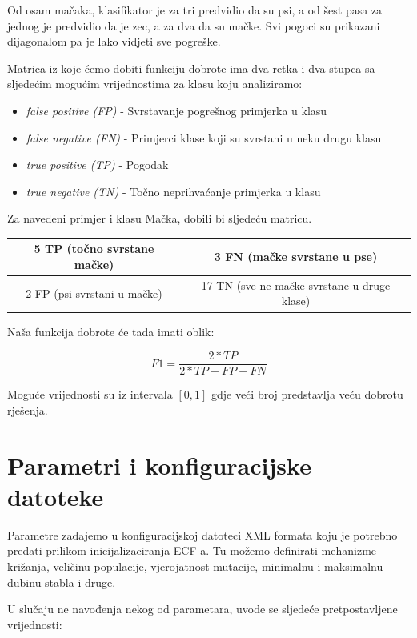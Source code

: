 \documentclass[times, utf8, zavrsni]{fer}
\begin{document}
Od osam mačaka, klasifikator je za tri predvidio da su psi, a od šest pasa za jednog je predvidio da je zec, a za dva da su mačke. Svi pogoci su prikazani dijagonalom pa je lako vidjeti sve pogreške.

Matrica iz koje ćemo dobiti funkciju dobrote ima dva retka i dva stupca sa sljedećim mogućim vrijednostima za klasu koju analiziramo:

\begin{itemize}
\item \textit{false positive (FP)} - Svrstavanje pogrešnog primjerka u klasu
\item \textit{false negative (FN)} - Primjerci klase koji su svrstani u neku drugu klasu
\item \textit{true positive  (TP)} - Pogodak
\item \textit{true negative  (TN)} - Točno neprihvaćanje primjerka u klasu

\end{itemize}

Za navedeni primjer i klasu Mačka, dobili bi sljedeću matricu.

\begin{center}
\begin{tabular}{|c|c|}
\hline
5 TP (točno svrstane mačke) & 3 FN (mačke svrstane u pse) \\
\hline
2 FP (psi svrstani u mačke) & 17 TN (sve ne-mačke svrstane u druge klase) \\
\hline
\end{tabular}
\end{center}

Naša funkcija dobrote će tada imati oblik:

\[ F1 = \frac{2 * TP}{2 * TP + FP + FN} \]

Moguće vrijednosti su iz intervala $[0, 1]$ gdje veći broj predstavlja veću dobrotu rješenja.



\section{Parametri i konfiguracijske datoteke}

Parametre zadajemo u konfiguracijskoj datoteci XML formata koju je potrebno predati prilikom inicijalizaciranja ECF-a. Tu možemo definirati mehanizme križanja, veličinu populacije, vjerojatnost mutacije, minimalnu i maksimalnu dubinu stabla i druge. 

U slučaju ne navođenja nekog od  parametara, uvode se sljedeće pretpostavljene vrijednosti: 
\end{document}

